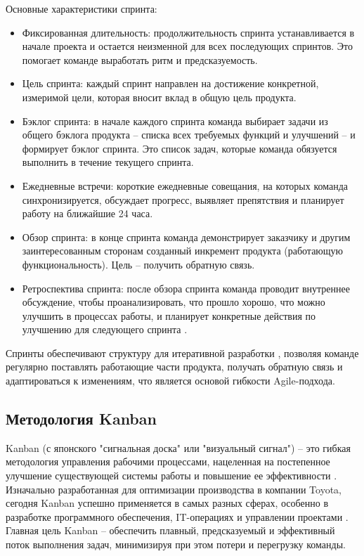 Основные характеристики спринта:
\begin{itemize}
	\item Фиксированная длительность: продолжительность спринта устанавливается в начале проекта и остается неизменной для всех последующих спринтов. Это помогает команде выработать ритм и предсказуемость.
	\item Цель спринта: каждый спринт направлен на достижение конкретной, измеримой цели, которая вносит вклад в общую цель продукта.
	\item Бэклог спринта: в начале каждого спринта команда выбирает задачи из общего бэклога продукта – списка всех требуемых функций и улучшений – и формирует бэклог спринта. Это список задач, которые команда обязуется выполнить в течение текущего спринта.
	\item Ежедневные встречи: короткие ежедневные совещания, на которых команда синхронизируется, обсуждает прогресс, выявляет препятствия и планирует работу на ближайшие 24 часа.
	\item Обзор спринта: в конце спринта команда демонстрирует заказчику и другим заинтересованным сторонам созданный инкремент продукта (работающую функциональность). Цель – получить обратную связь.
	\item Ретроспектива спринта: после обзора спринта команда проводит внутреннее обсуждение, чтобы проанализировать, что прошло хорошо, что можно улучшить в процессах работы, и планирует конкретные действия по улучшению для следующего спринта \cite{agile3}.
\end{itemize}

Спринты обеспечивают структуру для итеративной разработки \cite{agile5}, позволяя команде регулярно поставлять работающие части продукта, получать обратную связь и адаптироваться к изменениям, что является основой гибкости Agile-подхода.

\subsection{Методология Kanban}

Kanban (с японского "сигнальная доска" или "визуальный сигнал") – это гибкая методология управления рабочими процессами, нацеленная на постепенное улучшение существующей системы работы и повышение ее эффективности \cite{kanban1}. Изначально разработанная для оптимизации производства в компании Toyota, сегодня Kanban успешно применяется в самых разных сферах, особенно в разработке программного обеспечения, IT-операциях и управлении проектами \cite{kanban4}. Главная цель Kanban – обеспечить плавный, предсказуемый и эффективный поток выполнения задач, минимизируя при этом потери и перегрузку команды.

